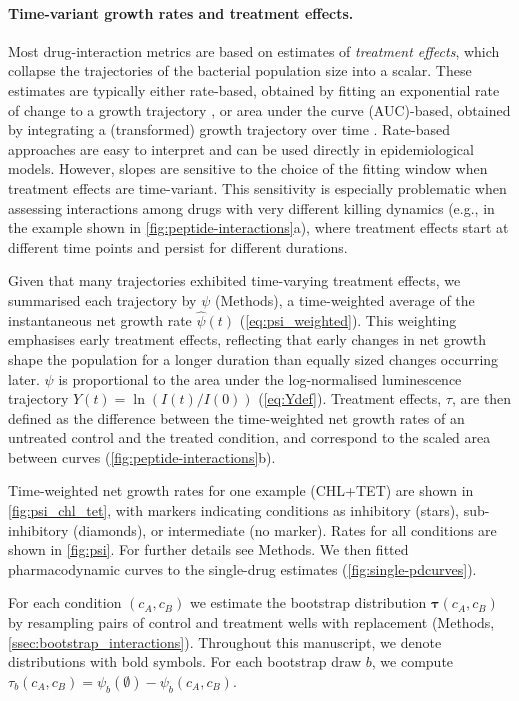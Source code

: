 \paragraph{Time-variant growth rates and treatment effects.}
Most drug-interaction metrics are based on estimates of \textit{treatment effects}, which collapse the trajectories of the bacterial population size into a scalar.
These estimates are typically either rate-based, obtained by fitting an exponential rate of change to a growth trajectory \cite{Regoes2004, Yeh2006, Chevereau2015a, Yu2016, Angermayr2022}, or area under the curve (AUC)-based, obtained by integrating a (transformed) growth trajectory over time \cite{MacGowan2000, Lenhard2015, Rao2017, Caballero2018, Chen2020, Sanchez-Hevia2025}.
Rate-based approaches are easy to interpret and can be used directly in epidemiological models.
However, slopes are sensitive to the choice of the fitting window when treatment effects are time-variant.
This sensitivity is especially problematic when assessing interactions among drugs with very different killing dynamics (e.g., in the example shown in \autoref{fig:peptide-interactions}a), where treatment effects start at different time points and persist for different durations.

Given that many trajectories exhibited time-varying treatment effects, we summarised each trajectory by \(\psi\) (Methods), a time-weighted average of the instantaneous net growth rate \(\hat{\psi}(t)\) (\autoref{eq:psi_weighted}).
This weighting emphasises early treatment effects, reflecting that early changes in net growth shape the population for a longer duration than equally sized changes occurring later.
\(\psi\) is proportional to the area under the log-normalised luminescence trajectory \(Y(t)=\ln(I(t)/I(0))\) (\autoref{eq:Ydef}).
Treatment effects, \(\tau\), are then defined as the difference between the time-weighted net growth rates of an untreated control and the treated condition, and correspond to the scaled area between curves (\autoref{fig:peptide-interactions}b).

Time-weighted net growth rates for one example (CHL+TET) are shown in \autoref{fig:psi_chl_tet}, with markers indicating conditions as inhibitory (stars), sub-inhibitory (diamonds), or intermediate (no marker).
Rates for all conditions are shown in \autoref{fig:psi}.
For further details see Methods.
We then fitted pharmacodynamic curves to the single-drug estimates (\autoref{fig:single-pdcurves}).

For each condition $(c_A, c_B)$ we estimate the bootstrap distribution \(\symbf{\tau}(c_A,c_B)\) by resampling pairs of control and treatment wells with replacement (Methods, \autoref{ssec:bootstrap_interactions}).
Throughout this manuscript, we denote distributions with bold symbols.
For each bootstrap draw \(b\), we compute \(\tau_b(c_A,c_B)=\psi_b(\emptyset)-\psi_b(c_A,c_B)\).

